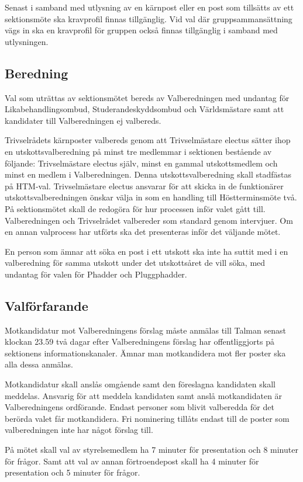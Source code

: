 \documentclass{dsekprotokoll}
\begin{document}
Senast i samband med utlysning av en kärnpost eller en post som tillsätts av ett sektionsmöte ska kravprofil finnas tillgänglig. Vid val där gruppsammansättning vägs in ska en kravprofil för gruppen också finnas
tillgänglig i samband med utlysningen.

\subsection{Beredning}
Val som uträttas av sektionsmötet bereds av Valberedningen med undantag för Likabehandlingsombud, Studerandeskyddsombud och Världsmästare samt att kandidater till Valberedningen ej valbereds.

Trivselrådets kärnposter valbereds genom att Trivselmästare electus sätter ihop en utskottsvalberedning på minst tre medlemmar i sektionen bestående av följande: Trivselmästare electus själv, minst en gammal utskottsmedlem och minst en medlem i Valberedningen. Denna utskottsvalberedning skall stadfästas på HTM-val. Trivselmästare electus ansvarar för att skicka in de funktionärer utskottsvalberedningen önskar välja in som en handling till Höstterminsmöte två. På sektionsmötet skall de redogöra för hur processen inför valet gått till. Valberedningen
och Trivselrådet valbereder som standard genom intervjuer. Om en annan valprocess har utförts ska det presenteras inför det väljande mötet.

En person som ämnar att söka en post i ett utskott ska inte ha suttit med i en valberedning för samma utskott under det utskottsåret de vill söka, med undantag för valen för Phadder och Pluggphadder.

\subsection{Valförfarande}
Motkandidatur mot Valberedningens förslag måste anmälas till Talman senast klockan 23.59 två dagar efter Valberedningens förslag har offentliggjorts på sektionens informationskanaler. Ämnar man motkandidera mot fler poster ska alla dessa anmälas.

Motkandidatur skall anslås omgående samt den föreslagna kandidaten skall meddelas. Ansvarig för att meddela kandidaten samt anslå motkandidaten är Valberedningens ordförande. Endast personer som blivit valberedda för det berörda valet får motkandidera.
Fri nominering tillåts endast till de poster som valberedningen inte har något förslag till.

På mötet skall val av styrelsemedlem ha 7 minuter för presentation och 8 minuter för frågor. Samt att val av annan förtroendepost skall ha 4 minuter för presentation och 5 minuter för frågor.
\end{document}
